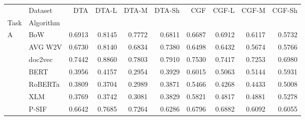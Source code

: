 \documentclass[11pt]{article}
\begin{document}
\begin{table}[ht!]
	\centering
	\footnotesize
	\begin{tabular}{L{0.3cm}lrrrrrrrr}
		\toprule
		& Dataset &     DTA &  DTA-L &  DTA-M &  DTA-Sh &  CGF &  CGF-L &  CGF-M &  CGF-Sh \\
		Task & Algorithm &         &            &             &            &               &                     &                      &                      \\
		\midrule
		A 	& BoW &  0.6913 &     0.8145 &      0.7772 &     0.6811 &        0.6687 &              0.6912 &               0.6117 &              0.5732 \\
		& AVG W2V &  0.6730 &     0.8140 &      0.6834 &     0.7380 &        0.6498 &              0.6432 &               0.5674 &              0.5766 \\
		& doc2vec &  0.7442 &     0.8860 &      0.7803 &     0.7910 &        0.7530 &              0.7417 &               0.7253 &              0.6980 \\
		& BERT &  0.3956 &     0.4157 &      0.2954 &     0.3929 &        0.6015 &              0.5063 &               0.5144 &              0.5931 \\
		& RoBERTa &  0.3809 &     0.3704 &      0.2989 &     0.3871 &        0.5466 &              0.4268 &               0.4433 &              0.5008 \\
		& XLM &  0.3769 &     0.3742 &      0.3081 &     0.3829 &        0.5821 &              0.4817 &               0.4881 &              0.5278 \\
		& P-SIF &  0.6642 &     0.7685 &      0.7264 &     0.6286 &        0.6796 &              0.6882 &               0.6092 &              0.6055 \\

\end{tabular}
\end{table}
\end{document}
